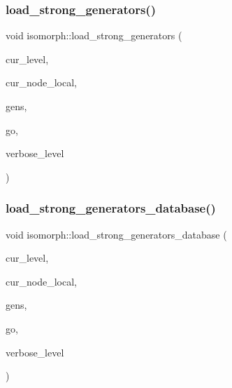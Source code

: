 \mbox{\label{classisomorph_af52fbb618753f562add541eee40b4068}} 
\subsubsection{\texorpdfstring{load\+\_\+strong\+\_\+generators()}{load\_strong\_generators()}}
{\footnotesize\ttfamily void isomorph\+::load\+\_\+strong\+\_\+generators (\begin{DoxyParamCaption}\item[{\mbox{\hyperlink{galois_8h_a09fddde158a3a20bd2dcadb609de11dc}{I\+NT}}}]{cur\+\_\+level,  }\item[{\mbox{\hyperlink{galois_8h_a09fddde158a3a20bd2dcadb609de11dc}{I\+NT}}}]{cur\+\_\+node\+\_\+local,  }\item[{\mbox{\hyperlink{classvector__ge}{vector\+\_\+ge}} \&}]{gens,  }\item[{\mbox{\hyperlink{classlonginteger__object}{longinteger\+\_\+object}} \&}]{go,  }\item[{\mbox{\hyperlink{galois_8h_a09fddde158a3a20bd2dcadb609de11dc}{I\+NT}}}]{verbose\+\_\+level }\end{DoxyParamCaption})}

\mbox{\label{classisomorph_a9e47a4c61a2d74511dfc8464608cf3c0}} 
\subsubsection{\texorpdfstring{load\+\_\+strong\+\_\+generators\+\_\+database()}{load\_strong\_generators\_database()}}
{\footnotesize\ttfamily void isomorph\+::load\+\_\+strong\+\_\+generators\+\_\+database (\begin{DoxyParamCaption}\item[{\mbox{\hyperlink{galois_8h_a09fddde158a3a20bd2dcadb609de11dc}{I\+NT}}}]{cur\+\_\+level,  }\item[{\mbox{\hyperlink{galois_8h_a09fddde158a3a20bd2dcadb609de11dc}{I\+NT}}}]{cur\+\_\+node\+\_\+local,  }\item[{\mbox{\hyperlink{classvector__ge}{vector\+\_\+ge}} \&}]{gens,  }\item[{\mbox{\hyperlink{classlonginteger__object}{longinteger\+\_\+object}} \&}]{go,  }\item[{\mbox{\hyperlink{galois_8h_a09fddde158a3a20bd2dcadb609de11dc}{I\+NT}}}]{verbose\+\_\+level }\end{DoxyParamCaption})}

